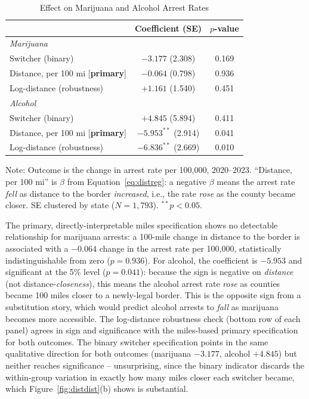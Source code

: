 \documentclass[11pt]{article}
\begin{document}
\begin{table}[htbp]
\centering
\caption{Effect on Marijuana and Alcohol Arrest Rates}
\label{tab:regA}
\begin{tabular}{@{}lcc@{}}
\toprule
 & Coefficient (SE) & $p$-value \\
\midrule
\textit{Marijuana} & & \\
\quad Switcher (binary) & $-3.177$ (2.308) & 0.169 \\
\quad Distance, per 100 mi [\textbf{primary}] & $-0.064$ (0.798) & 0.936 \\
\quad Log-distance (robustness) & $+1.161$ (1.540) & 0.451 \\
\textit{Alcohol} & & \\
\quad Switcher (binary) & $+4.845$ (5.894) & 0.411 \\
\quad Distance, per 100 mi [\textbf{primary}] & $-5.953^{**}$ (2.914) & 0.041 \\
\quad Log-distance (robustness) & $-6.836^{**}$ (2.669) & 0.010 \\
\bottomrule
\end{tabular}
\vspace{2pt}
\begin{minipage}{0.9\textwidth}
\footnotesize Note: Outcome is the change in arrest rate per 100{,}000,
2020--2023. ``Distance, per 100 mi'' is $\beta$ from
Equation~\ref{eq:distreg}: a negative $\beta$ means the arrest rate
\emph{fell} as distance to the border \emph{increased}, i.e., the rate
\emph{rose} as the county became closer. SE clustered by state
($N=1{,}793$). $^{**}p<0.05$.
\end{minipage}
\end{table}

The primary, directly-interpretable miles specification shows no
detectable relationship for marijuana arrests: a 100-mile change in
distance to the border is associated with a $-0.064$ change in the
arrest rate per 100{,}000, statistically indistinguishable from zero
($p=0.936$). For alcohol, the coefficient is $-5.953$ and significant
at the 5\% level ($p=0.041$): because the sign is negative on
\emph{distance} (not distance-\emph{closeness}), this means the
alcohol arrest rate \emph{rose} as counties became 100 miles closer to
a newly-legal border. This is the opposite sign from a substitution
story, which would predict alcohol arrests to \emph{fall} as
marijuana becomes more accessible. The log-distance robustness check
(bottom row of each panel) agrees in sign and significance with the
miles-based primary specification for both outcomes. The binary
switcher specification points in the same qualitative direction for
both outcomes (marijuana $-3.177$, alcohol $+4.845$) but neither
reaches significance -- unsurprising, since the binary indicator
discards the within-group variation in exactly how many miles closer
each switcher became, which Figure~\ref{fig:distdist}(b) shows is
substantial.
\end{document}
